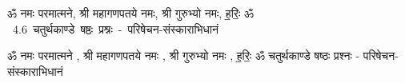 \documentclass[17pt]{extarticle}
\begin{document}
\begin{titlepage}
    \begin{center}
 
\begin{sanskrit}
    { \Large
    ॐ नमः परमात्मने, श्री महागणपतये नमः, 
श्री गुरुभ्यो नमः, ह॒रिः॒ ॐ 
    }
    \\
    \vspace{2.5cm}
    \mbox{ \Huge
    4.6      चतुर्थकाण्डे षष्ठः प्रश्नः - परिषेचन-संस्काराभिधानं   }
\end{sanskrit}
\end{center}

\end{titlepage}
\tableofcontents

ॐ नमः परमात्मने , श्री महागणपतये नमः , श्री गुरुभ्यो नमः , ह॒रिः॒ ॐ       चतुर्थकाण्डे षष्ठः प्रश्नः - परिषेचन-संस्काराभिधानं \newline

\end{document}
